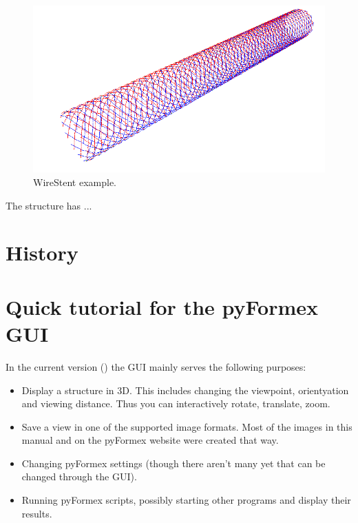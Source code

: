 \documentclass[a4paper]{manual}
\newcommand{\pyformex}{pyFormex\xspace}
\begin{document}
\begin{figure}[h]
  \begin{makeimage}
  \end{makeimage}
  \centering
  \begin{latexonly}
  \includegraphics[width=12cm]{images/wirestent}
  \end{latexonly}
  \begin{htmlonly}
  \end{htmlonly}  \caption{WireStent example.}
\end{figure}


The structure has ...


\section{History}
\label{sec:history}

\section{Quick tutorial for the \pyformex{} GUI}
\label{sec:gui-tutorial}
In the current version () the GUI mainly serves the following purposes:
\begin{itemize}
\item Display a structure in 3D. This includes changing the viewpoint, orientyation and viewing distance. Thus you can interactively rotate, translate, zoom.
\item Save a view in one of the supported image formats. Most of the images in this manual and on the \pyformex{} website were created that way. 
\item Changing \pyformex settings (though there aren't many yet that can be changed through the GUI).
\item Running \pyformex scripts, possibly starting other programs and display their results.
\end{itemize}
\end{document}
